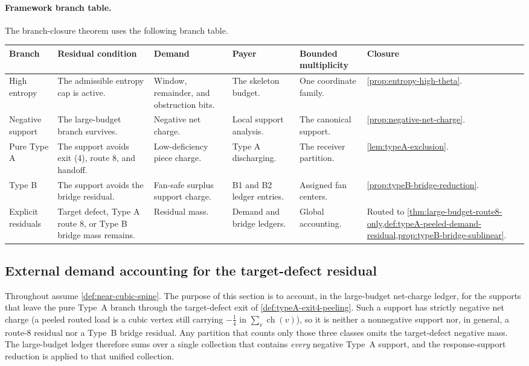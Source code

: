 \documentclass[11pt]{article}
\newcommand{\ch}{\operatorname{ch}}
\newcommand{\FrameworkBranchTableHeader}{%
\toprule
\textbf{Branch} & \textbf{Residual condition} & \textbf{Demand} & \textbf{Payer} & \textbf{Bounded multiplicity} & \textbf{Closure}\\
\midrule
}
\begin{document}
\paragraph{Framework branch table.}
The branch-closure theorem uses the following branch table.
\begin{longtable}{L{0.13\textwidth} L{0.19\textwidth} L{0.14\textwidth} L{0.14\textwidth} L{0.17\textwidth} L{0.17\textwidth}}
\FrameworkBranchTableHeader
High entropy
&
The admissible entropy cap is active.
&
Window, remainder, and obstruction bits.
&
The skeleton budget.
&
One coordinate family.
&
\cref{prop:entropy-high-theta}.
\\
\addlinespace
Negative support
&
The large-budget branch survives.
&
Negative net charge.
&
Local support analysis.
&
The canonical support.
&
\cref{prop:negative-net-charge}.
\\
\addlinespace
Pure Type A
&
The support avoids exit \textup{(4)}, route 8, and handoff.
&
Low-deficiency piece charge.
&
Type A discharging.
&
The receiver partition.
&
\cref{lem:typeA-exclusion}.
\\
\addlinespace
Type B
&
The support avoids the bridge residual.
&
Fan-safe surplus support charge.
&
B1 and B2 ledger entries.
&
Assigned fan centers.
&
\cref{prop:typeB-bridge-reduction}.
\\
\addlinespace
Explicit residuals
&
Target defect, Type A route 8, or Type B bridge mass remains.
&
Residual mass.
&
Demand and bridge ledgers.
&
Global accounting.
&
Routed to
\cref{thm:large-budget-route8-only,def:typeA-peeled-demand-residual,prop:typeB-bridge-sublinear}.
\\
\bottomrule
\end{longtable}

\subsection{External demand accounting for the target-defect residual}\label{sec:exit4-closure}

Throughout assume \cref{def:near-cubic-spine}.  The purpose of this section is to
account, in the large-budget net-charge ledger, for the supports that leave the
pure Type~A branch through the target-defect exit of
\cref{def:typeA-exit4-peeling}.  Such a support has strictly negative net charge
(a peeled routed load is a cubic vertex still carrying $-\tfrac14$ in
$\sum_v\ch(v)$), so it is neither a nonnegative support nor, in general, a
route-8 residual nor a Type~B bridge residual.  Any partition that counts only
those three classes omits the target-defect negative mass.  The large-budget
ledger therefore sums over a single collection that contains \emph{every}
negative Type~A support, and the response-support reduction is applied to that unified
collection.
\end{document}
